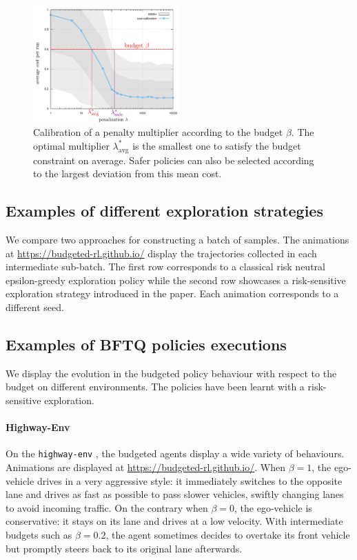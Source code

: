 \begin{subappendices}
\begin{figure}[tp]
	\centering
	\includegraphics[width=0.5\textwidth]{img/CalibrationExample}
	\caption{Calibration of a penalty multiplier according to the budget $\beta$. The optimal multiplier $\lambda^*_{\text{avg}}$ is the smallest one to satisfy the budget constraint on average. Safer policies can also be selected according to the largest deviation from this mean cost.}
	\label{fig:Lagrangian}
\end{figure}

\subsection{Examples of different exploration strategies}
\label{subsec:exploration-examples}
We compare two approaches for constructing a batch of samples. The animations at  \href{https://budgeted-rl.github.io/\#risk-sensitive-exploration}{https://budgeted-rl.github.io/} display the trajectories collected in each intermediate sub-batch. The first row corresponds to a classical  risk neutral epsilon-greedy exploration policy while the second row showcases a risk-sensitive exploration strategy introduced in the paper. Each animation corresponds to a different seed.

\subsection{Examples of BFTQ policies executions}
\label{sec:bftq-executions}

We display the evolution in the budgeted policy behaviour with respect to the budget on different environments. The policies have been learnt with a risk-sensitive exploration.

\paragraph{Highway-Env}

On the \texttt{highway-env} , the budgeted agents display a wide variety of behaviours. Animations are displayed at  \href{https://budgeted-rl.github.io/\#driving-styles}{https://budgeted-rl.github.io/}. When $\beta = 1$, the ego-vehicle drives in a very aggressive style: it immediately switches to the opposite lane and drives as fast as possible to pass slower vehicles, swiftly changing lanes to avoid incoming traffic. On the contrary when $\beta = 0$, the ego-vehicle is conservative: it stays on its lane and drives at a low velocity. With intermediate budgets such as $\beta = 0.2$, the agent sometimes decides to overtake its front vehicle but promptly steers back to its original lane afterwards.


\end{subappendices}
